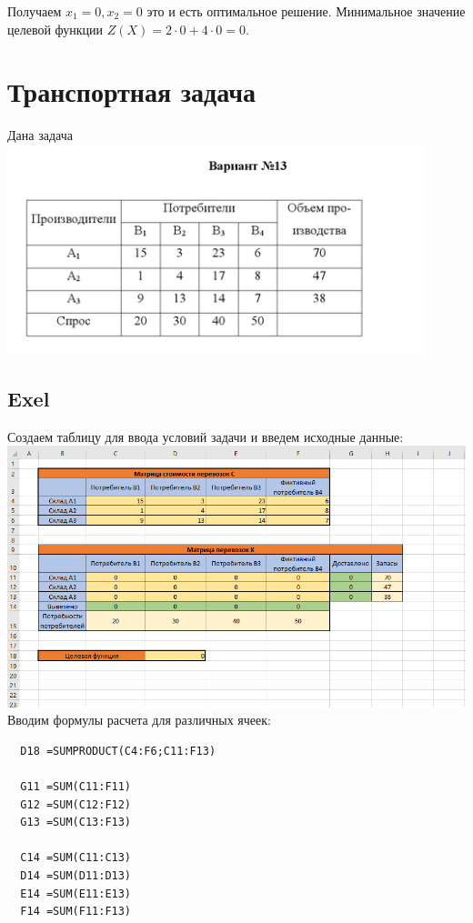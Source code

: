 \documentclass[a4paper, 12pt]{article}
\begin{document}
Получаем $x_1 = 0, x_2 = 0$ это и есть оптимальное решение. Минимальное значение целевой функции $Z(X) = 2 \cdot 0 + 4 \cdot 0 = 0$.
\newpage
\section{Транспортная задача}
Дана задача \\
\includegraphics{2-1.png}\\

\subsection{Exel}
Создаем таблицу для ввода условий задачи и введем исходные данные:\\

\includegraphics[width=\textwidth]{2-2.png}\\

Вводим формулы расчета для различных ячеек:
\begin{verbatim}
  D18 =SUMPRODUCT(C4:F6;C11:F13)

  G11 =SUM(C11:F11)
  G12 =SUM(C12:F12)
  G13 =SUM(C13:F13)

  C14 =SUM(C11:C13)
  D14 =SUM(D11:D13)
  E14 =SUM(E11:E13)
  F14 =SUM(F11:F13)
\end{verbatim}
\end{document}

